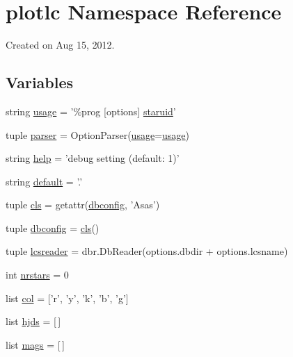 \hypertarget{namespaceplotlc}{
\section{plotlc Namespace Reference}
\label{namespaceplotlc}
}


Created on Aug 15, 2012.  


\subsection*{Variables}
\begin{DoxyCompactItemize}
\item 
string \hyperlink{namespaceplotlc_ae4114e18ea1de203a5df329cabaf76e5}{usage} = '\%prog \mbox{[}options\mbox{]} \hyperlink{namespaceplotlc_a0f4044b7c539ef06d771594b766ca44b}{staruid}'
\item 
tuple \hyperlink{namespaceplotlc_abb846dd0f2e1e6a77c518417f0504a52}{parser} = OptionParser(\hyperlink{namespaceplotlc_ae4114e18ea1de203a5df329cabaf76e5}{usage}=\hyperlink{namespaceplotlc_ae4114e18ea1de203a5df329cabaf76e5}{usage})
\item 
string \hyperlink{namespaceplotlc_a19d5157c64a1c0f983eb1b6ac77d28ad}{help} = 'debug setting (default: 1)'
\item 
string \hyperlink{namespaceplotlc_a78b903191c52c9ae7de23c57e216c537}{default} = '.'
\item 
tuple \hyperlink{namespaceplotlc_aa0d67ca52f94cf7df7e8d42908675f95}{cls} = getattr(\hyperlink{namespaceplotlc_ad02f25ea0c738c3d1867127ee20ae0a2}{dbconfig}, 'Asas')
\item 
tuple \hyperlink{namespaceplotlc_ad02f25ea0c738c3d1867127ee20ae0a2}{dbconfig} = \hyperlink{namespaceplotlc_aa0d67ca52f94cf7df7e8d42908675f95}{cls}()
\item 
tuple \hyperlink{namespaceplotlc_a2a0d074a3711ec9740f0c40e2b5f6739}{lcsreader} = dbr.DbReader(options.dbdir + options.lcsname)
\item 
int \hyperlink{namespaceplotlc_a84471a136dabdafed339bdf74af64d6c}{nrstars} = 0
\item 
list \hyperlink{namespaceplotlc_a1a420be8a418faa806bb3f235a64b7b4}{col} = \mbox{[}'r', 'y', 'k', 'b', 'g'\mbox{]}
\item 
list \hyperlink{namespaceplotlc_a6d96382c484c88c062cee8524f2b3b4a}{hjds} = \mbox{[}$\,$\mbox{]}
\item 
list \hyperlink{namespaceplotlc_abdfb5c2d4ea6f8b8a078e7a8098cf810}{mags} = \mbox{[}$\,$\mbox{]}
\item 

\end{DoxyCompactItemize}
